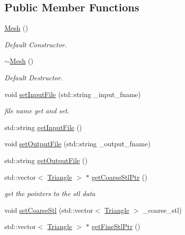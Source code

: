 \subsection*{Public Member Functions}
\begin{DoxyCompactItemize}
\item 
\hyperlink{classkia_1_1Mesh_a6d31be3add31b23b164f7ea5bacacab1}{Mesh} ()
\begin{DoxyCompactList}\small\item\em Default Constructor. \end{DoxyCompactList}\item 
\hyperlink{classkia_1_1Mesh_a0fc3e61609c5ce4dc3240478e7d73fa5}{$\sim$\-Mesh} ()
\begin{DoxyCompactList}\small\item\em Default Destructor. \end{DoxyCompactList}\item 
void \hyperlink{classkia_1_1Mesh_ad6f033b3330317e34e0072fa73eb700a}{set\-Input\-File} (std\-::string \-\_\-input\-\_\-fname)
\begin{DoxyCompactList}\small\item\em file name get and set. \end{DoxyCompactList}\item 
std\-::string \hyperlink{classkia_1_1Mesh_a10e7f6e578f01509ae5ec238d826705b}{get\-Input\-File} ()
\item 
void \hyperlink{classkia_1_1Mesh_aa43e3f6964a8d900b1c65c5449942833}{set\-Output\-File} (std\-::string \-\_\-output\-\_\-fname)
\item 
std\-::string \hyperlink{classkia_1_1Mesh_a8771719129dc6a666c99eec812ab6a6e}{get\-Output\-File} ()
\item 
std\-::vector$<$ \hyperlink{classkia_1_1Triangle}{Triangle} $>$ $\ast$ \hyperlink{classkia_1_1Mesh_a7c84c862b5b93cfdcb44495571ec8d7b}{get\-Coarse\-Stl\-Ptr} ()
\begin{DoxyCompactList}\small\item\em get the pointers to the stl data \end{DoxyCompactList}\item 
void \hyperlink{classkia_1_1Mesh_a6c546d8575705f02ebba86152be846f1}{set\-Coarse\-Stl} (std\-::vector$<$ \hyperlink{classkia_1_1Triangle}{Triangle} $>$ \-\_\-coarse\-\_\-stl)
\item 
std\-::vector$<$ \hyperlink{classkia_1_1Triangle}{Triangle} $>$ $\ast$ \hyperlink{classkia_1_1Mesh_aa7bda18b0920b1e7a8993b98938f5c04}{get\-Fine\-Stl\-Ptr} ()
\item 

\end{DoxyCompactItemize}

